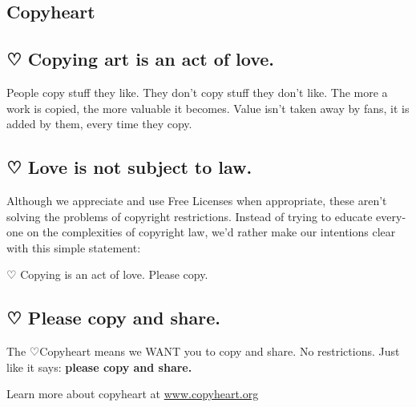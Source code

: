 \newpage
\begin{english}
\section*{Copyheart}

\subsection*{ {\dejavu ♡} Copying art is an act of love.}

People copy stuff they like. They don’t copy stuff they don’t like. The more a work is copied, the more valuable it becomes. Value isn’t taken away by fans, it is added by them, every time they copy.

\subsection*{ {\dejavu ♡} Love is not subject to law.}

Although we appreciate and use Free Licenses when appropriate, these aren’t solving the problems of copyright restrictions. Instead of trying to educate everyone on the complexities of copyright law, we’d rather make our intentions clear with this simple statement:

\begin{framed}
   \begin{center} {\dejavu ♡} Copying is an act of love. Please copy. \end{center}
\end{framed}

\subsection*{ {\dejavu ♡} Please copy and share.}

The {\dejavu ♡}Copyheart means we WANT you to copy and share. No restrictions. Just like it says: \textbf{please copy and share.}

\bigskip
Learn more about copyheart at \url{www.copyheart.org}
\end{english}
